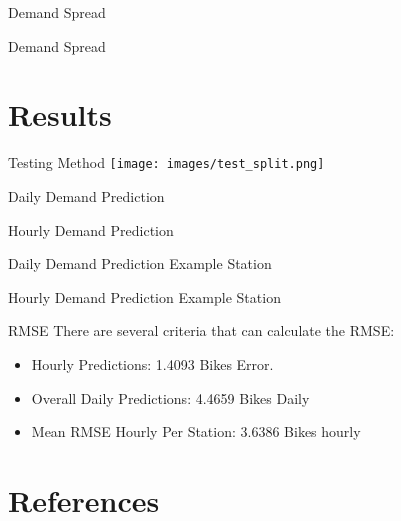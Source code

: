 \documentclass[
  ignorenonframetext,
]{beamer}
\providecommand{\tightlist}{%
  \setlength{\itemsep}{0pt}\setlength{\parskip}{0pt}}
\begin{document}
\begin{frame}{Demand Spread}
\protect\hypertarget{demand-spread}{}
\end{frame}

\begin{frame}{Demand Spread}
\protect\hypertarget{demand-spread-1}{}
\end{frame}

\hypertarget{results}{%
\section{Results}\label{results}}

\begin{frame}{Testing Method}
\protect\hypertarget{testing-method}{}
\texttt{[image: images/test\_split.png]}
\end{frame}

\begin{frame}{Daily Demand Prediction}
\protect\hypertarget{daily-demand-prediction}{}
\end{frame}

\begin{frame}{Hourly Demand Prediction}
\protect\hypertarget{hourly-demand-prediction}{}
\end{frame}

\begin{frame}{Daily Demand Prediction Example Station}
\protect\hypertarget{daily-demand-prediction-example-station}{}
\end{frame}

\begin{frame}{Hourly Demand Prediction Example Station}
\protect\hypertarget{hourly-demand-prediction-example-station}{}
\end{frame}

\begin{frame}{RMSE}
\protect\hypertarget{rmse}{}
There are several criteria that can calculate the RMSE:

\begin{itemize}
\tightlist
\item
  Hourly Predictions: 1.4093 Bikes Error.
\item
  Overall Daily Predictions: 4.4659 Bikes Daily
\item
  Mean RMSE Hourly Per Station: 3.6386 Bikes hourly
\end{itemize}
\end{frame}

\hypertarget{references}{%
\section{References}\label{references}}
\end{document}

